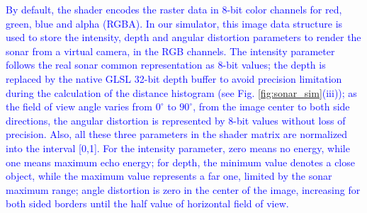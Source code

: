 \documentclass[final,5p,times]{elsarticle}
\begin{document}
\textcolor{blue}{By default, the shader encodes the raster data in 8-bit color channels for red, green, blue and alpha (RGBA). In our simulator, this image data structure is used to store the intensity, depth and angular distortion parameters to render the sonar from a virtual camera, in the RGB channels. The intensity parameter follows the real sonar common representation as 8-bit values; the depth is replaced by the native GLSL 32-bit depth buffer to avoid precision limitation during the calculation of the distance histogram (see Fig. \ref{fig:sonar_sim}(iii)); as the field of view angle varies from $0^{\circ}$ to $90^{\circ}$, from the image center to both side directions, the angular distortion is represented by 8-bit values without loss of precision. Also, all these three parameters in the shader matrix are normalized into the interval [0,1]. For the intensity parameter, zero means no energy, while one means maximum echo energy; for depth, the minimum value denotes a close object, while the maximum value represents a far one, limited by the sonar maximum range; angle distortion is zero in the center of the image, increasing for both sided borders until the half value of horizontal field of view.}
\end{document}

